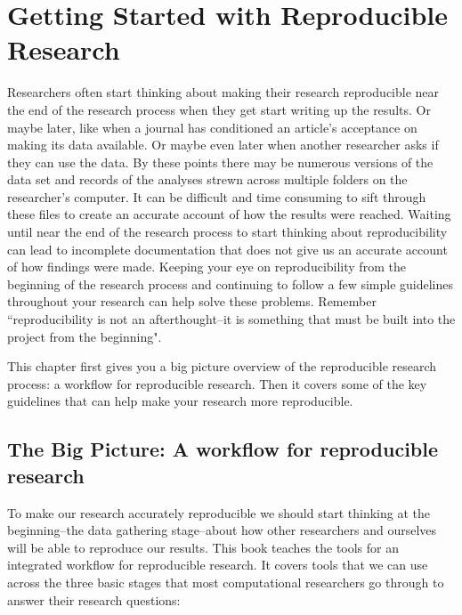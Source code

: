 



\chapter{Getting Started with Reproducible Research}\label{GettingStartedRR}

Researchers often start thinking about making their research reproducible near the end of the research process when they get start writing up the results. Or maybe later, like when a journal has conditioned an article's acceptance on making its data available. Or maybe even later when another researcher asks if they can use the data. By these points there may be numerous versions of the data set and records of the analyses strewn across multiple folders on the researcher's computer. It can be difficult and time consuming to sift through these files to create an accurate account of how the results were reached. Waiting until near the end of the research process to start thinking about reproducibility can lead to incomplete documentation that does not give us an accurate account of how findings were made. Keeping your eye on reproducibility from the beginning of the research process and continuing to follow a few simple guidelines throughout your research can help solve these problems. Remember ``reproducibility is not an afterthought--it is something that must be built into the project from the beginning"\cite[386]{Donoho2010}.

This chapter first gives you a big picture overview of the reproducible research process: a workflow for reproducible research. Then it covers some of the key guidelines that can help make your research more reproducible.

\section{The Big Picture: A workflow for reproducible research}

To make our research accurately reproducible we should start thinking at the beginning--the data gathering stage--about how other researchers and ourselves will be able to reproduce our results. This book teaches the tools for an integrated workflow for reproducible research. It covers tools that we can use across the three basic stages that most computational researchers go through to answer their research questions:

